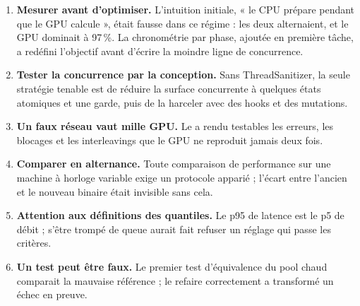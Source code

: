 \begin{enumerate}[leftmargin=1.4em]
  \item \textbf{Mesurer avant d'optimiser.} L'intuition initiale, « le CPU
  prépare pendant que le GPU calcule », \'etait fausse dans ce r\'egime : les
  deux alternaient, et le GPU dominait \`a 97\,\%. La chronom\'etrie par
  phase, ajout\'ee en premi\`ere t\^ache, a red\'efini l'objectif avant
  d'\'ecrire la moindre ligne de concurrence.
  \item \textbf{Tester la concurrence par la conception.} Sans
  ThreadSanitizer, la seule strat\'egie tenable est de r\'eduire la surface
  concurrente \`a quelques \'etats atomiques et une garde, puis de la
  harceler avec des hooks et des mutations.
  \item \textbf{Un faux r\'eseau vaut mille GPU.} Le 
  a rendu testables les erreurs, les blocages et les interleavings que le
  GPU ne reproduit jamais deux fois.
  \item \textbf{Comparer en alternance.} Toute comparaison de performance sur
  une machine \`a horloge variable exige un protocole appari\'e ; l'\'ecart
  entre l'ancien et le nouveau binaire \'etait invisible sans cela.
  \item \textbf{Attention aux d\'efinitions des quantiles.} Le p95 de
  latence est le p5 de d\'ebit ; s'\^etre tromp\'e de queue aurait fait
  refuser un r\'eglage qui passe les crit\`eres.
  \item \textbf{Un test peut \^etre faux.} Le premier test d'\'equivalence du
  pool chaud comparait la mauvaise r\'ef\'erence ; le refaire correctement a
  transform\'e un \'echec en preuve.
\end{enumerate}
